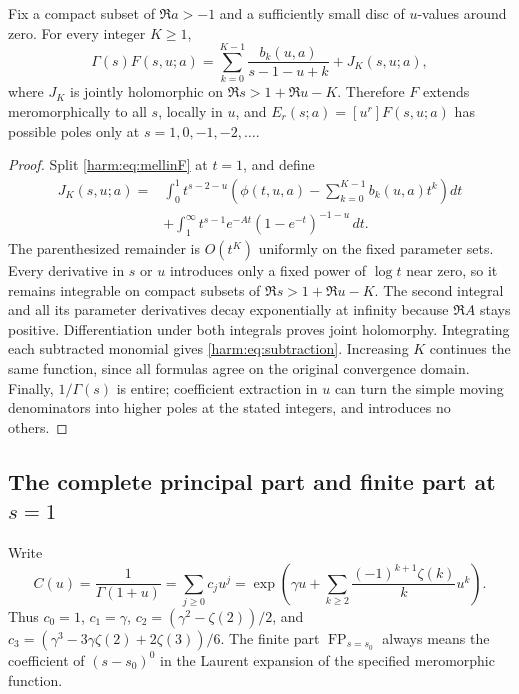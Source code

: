 \begin{lemma}\label{harm:lem:subtract}
Fix a compact subset of $\Re a>-1$ and a sufficiently small disc of
$u$-values around zero.  For every integer $K\geq1$,
\begin{equation}\label{harm:eq:subtraction}
 \Gamma(s)F(s,u;a)
   =\sum_{k=0}^{K-1}\frac{b_k(u,a)}{s-1-u+k}
       +J_K(s,u;a),
\end{equation}
where $J_K$ is jointly holomorphic on
$\Re s>1+\Re u-K$.  Therefore $F$ extends meromorphically to all
$s$, locally in $u$, and $E_r(s;a)=[u^r]F(s,u;a)$ has possible
poles only at $s=1,0,-1,-2,\ldots$.
\end{lemma}
\begin{proof}
Split \eqref{harm:eq:mellinF} at $t=1$, and define
\begin{align*}
 J_K(s,u;a)={}&\int_0^1 t^{s-2-u}
       \left(\phi(t,u,a)-\sum_{k=0}^{K-1}b_k(u,a)t^k\right)dt\\
 &+\int_1^{\infty}t^{s-1}e^{-At}
                  (1-e^{-t})^{-1-u}\,dt.
\end{align*}
The parenthesized remainder is $O(t^K)$ uniformly on the fixed
parameter sets.  Every derivative in $s$ or $u$ introduces only a
fixed power of $\log t$ near zero, so it remains integrable on compact
subsets of $\Re s>1+\Re u-K$.  The second integral and all its
parameter derivatives decay exponentially at infinity because
$\Re A$ stays positive.  Differentiation under both integrals proves
joint holomorphy.  Integrating each subtracted monomial gives
\eqref{harm:eq:subtraction}.  Increasing $K$ continues the same
function, since all formulas agree on the original convergence
domain.  Finally, $1/\Gamma(s)$ is entire; coefficient extraction
in $u$ can turn the simple moving denominators into higher poles
at the stated integers, and introduces no others.
\end{proof}

\subsection{The complete principal part and finite part at \texorpdfstring{$s=1$}{s=1}}

Write
\begin{equation}\label{harm:eq:c}
 C(u)=\frac1{\Gamma(1+u)}=\sum_{j\geq0}c_ju^j
 =\exp\left(\gamma u+
       \sum_{k\geq2}\frac{(-1)^{k+1}\zeta(k)}k u^k\right).
\end{equation}
Thus $c_0=1$, $c_1=\gamma$,
$c_2=(\gamma^2-\zeta(2))/2$, and
$c_3=(\gamma^3-3\gamma\zeta(2)+2\zeta(3))/6$.
The finite part $\operatorname{FP}_{s=s_0}$ always means the
coefficient of $(s-s_0)^0$ in the Laurent expansion of the specified
meromorphic function.

